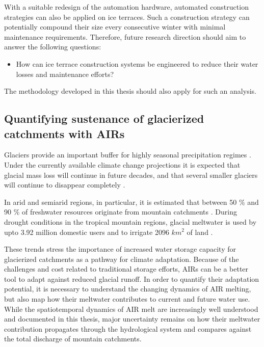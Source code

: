 With a suitable redesign of the automation hardware, automated construction strategies can also be applied on
ice terraces. Such a construction strategy can potentially compound their size every consecutive winter with
minimal maintenance requirements. Therefore, future research direction should aim to answer the following
questions:

\begin{itemize}

	\item How can ice terrace construction systems be engineered to reduce their water losses and maintenance
	      efforts?

\end{itemize}

The methodology developed in this thesis should also apply for such an analysis.

\subsection{Quantifying sustenance of glacierized catchments with AIRs}

Glaciers provide an important buffer for highly seasonal precipitation regimes
\citep{kaserContributionPotentialGlaciers2010}. Under the currently available climate change projections it is
expected that glacial mass loss will continue in future decades, and that several smaller glaciers will continue
to disappear completely \citep{rabatelCurrentStateGlaciers2013}.

In arid and semiarid regions, in particular, it is estimated that between 50 \% and 90 \% of freshwater
resources originate from mountain catchments \citep{messerliMountainsWorldVulnerable2004}. During drought
conditions in the tropical mountain regions, glacial meltwater is used by upto 3.92 million domestic users and
to irrigate 2096 $km^2$ of land \citep{buytaertGlacialMeltContent2017}.

These trends stress the importance of increased water storage capacity for glacierized catchments as a pathway
for climate adaptation. Because of the challenges and cost related to traditional storage efforts, AIRs can be
a better tool to adapt against reduced glacial runoff. In order to quantify their adaptation potential, it
is necessary to understand the changing dynamics of AIR melting, but also map how their meltwater contributes to
current and future water use. While the spatiotemporal dynamics of AIR melt are increasingly well understood and
documented in this thesis, major uncertainty remains on how their meltwater contribution propagates through the
hydrological system and compares against the total discharge of mountain catchments.

